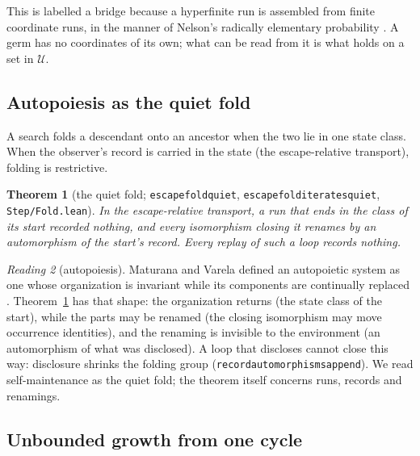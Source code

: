 \documentclass[]{article}
\newtheorem{theorem}{Theorem}
\theoremstyle{definition}
\theoremstyle{remark}
\newtheorem{reading}[theorem]{Reading}
\newcommand{\codeus}{\textunderscore\allowbreak}
\newcommand{\code}[1]{\texttt{\let\_\codeus #1}}
\newcommand{\lpath}[1]{{\ttfamily\nolinkurl{#1}}}
\newcommand{\Uf}{\mathcal{U}}
\newcommand{\step}[1]{\lpath{Step/#1.lean}}
\begin{document}
This is labelled a bridge because a hyperfinite run is assembled from finite coordinate runs, in the
manner of Nelson's radically elementary probability \cite{Nelson1987}. A germ has no coordinates of
its own; what can be read from it is what holds on a set in $\Uf$.

\subsection{Autopoiesis as the quiet fold}
\label{sec:quiet}

A search folds a descendant onto an ancestor when the two lie in one state class. When the observer's
record is carried in the state (the escape-relative transport), folding is restrictive.

\begin{theorem}[the quiet fold; \code{escape\_fold\_quiet}, \code{escape\_fold\_iterates\_quiet}, \step{Fold}]
\label{thm:quiet}
In the escape-relative transport, a run that ends in the class of its start recorded nothing, and
every isomorphism closing it renames by an automorphism of the start's record. Every replay of such a
loop records nothing.
\end{theorem}

\begin{reading}[autopoiesis]
\label{read:autopoiesis}
Maturana and Varela defined an autopoietic system as one whose organization is invariant while its
components are continually replaced \cite{MaturanaVarela1980}. Theorem~\ref{thm:quiet} has that
shape: the organization returns (the state class of the start), while the parts may be renamed (the
closing isomorphism may move occurrence identities), and the renaming is invisible to the environment
(an automorphism of what was disclosed). A loop that discloses cannot close this way: disclosure
shrinks the folding group (\code{record\_automorphisms\_append}). We read self-maintenance as the quiet
fold; the theorem itself concerns runs, records and renamings.
\end{reading}

\subsection{Unbounded growth from one cycle}
\label{sec:pump}
\end{document}
